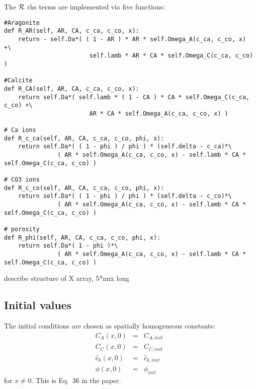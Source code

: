 \documentclass[a4paper]{article}
\begin{document}
The ${\cal R}$ rhs terms are implemented via five functions:
\begin{lstlisting}
#Aragonite
def R_AR(self, AR, CA, c_ca, c_co, x):
    return - self.Da*( ( 1 - AR ) * AR * self.Omega_A(c_ca, c_co, x) +\
                        self.lamb * AR * CA * self.Omega_C(c_ca, c_co) )

#Calcite
def R_CA(self, AR, CA, c_ca, c_co, x):
    return self.Da*( self.lamb * ( 1 - CA ) * CA * self.Omega_C(c_ca, c_co) +\
                        AR * CA * self.Omega_A(c_ca, c_co, x) )

# Ca ions
def R_c_ca(self, AR, CA, c_ca, c_co, phi, x):
    return self.Da*( ( 1 - phi ) / phi ) * (self.delta - c_ca)*\
               ( AR * self.Omega_A(c_ca, c_co, x) - self.lamb * CA * self.Omega_C(c_ca, c_co) )

# CO3 ions
def R_c_co(self, AR, CA, c_ca, c_co, phi, x):
    return self.Da*( ( 1 - phi ) / phi ) * (self.delta - c_co)*\
               ( AR * self.Omega_A(c_ca, c_co, x) - self.lamb * CA * self.Omega_C(c_ca, c_co) )

# porosity
def R_phi(self, AR, CA, c_ca, c_co, phi, x):
    return self.Da*( 1 - phi )*\
               ( AR * self.Omega_A(c_ca, c_co, x) - self.lamb * CA * self.Omega_C(c_ca, c_co) )
\end{lstlisting}

















describe structure of X array, 5*nnx long


\subsection*{Initial values}

The initial conditions are chosen as spatially homogeneous constants:
\begin{eqnarray}
C_A(x,0)&=&C_{A,init} \\
C_C(x,0)&=&C_{C,init} \\
\hat{c}_k(x,0)&=&\hat{c}_{k,init} \\
\phi(x,0) &=& \phi_{init}
\end{eqnarray}
for $x\ne 0$. This is Eq.~36 in the paper.
\end{document}
